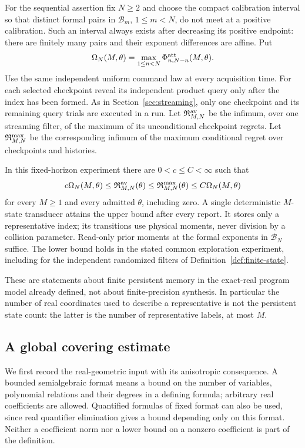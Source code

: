 For the sequential assertion fix $N\ge2$ and choose the compact
calibration interval so that distinct formal pairs in
$\mathcal B_m$, $1\le m<N$, do not meet at a positive calibration.
Such an interval always exists after decreasing its positive endpoint:
there are finitely many pairs and their exponent differences are affine.
Put
\begin{equation}\label{eq:general-stream-profile}
 \Omega_N(M,\theta)
   =\max_{1\le n<N}\Phi^{\rm att}_{n,N-n}(M,\theta).
\end{equation}
Use the same independent uniform command law at every acquisition time.
For each selected checkpoint reveal its independent product query only
after the index has been formed. As in Section~\ref{sec:streaming}, only
one checkpoint and its remaining query trials are executed in a run.
Let $\mathfrak R^{\rm av}_{M,N}$ be the infimum, over one streaming
filter, of the maximum of its unconditional checkpoint regrets. Let
$\mathfrak R^{\rm max}_{M,N}$ be the corresponding infimum of the
maximum conditional regret over checkpoints and histories.

\begin{theorem}\label{thm:general-uniform-streaming}
In this fixed-horizon experiment there are $0<c\le C<\infty$ such that
\begin{equation}\label{eq:general-stream-law}
 c\Omega_N(M,\theta)\le\mathfrak R^{\rm av}_{M,N}(\theta)
 \le\mathfrak R^{\rm max}_{M,N}(\theta)
 \le C\Omega_N(M,\theta)
\end{equation}
for every $M\ge1$ and every admitted $\theta$, including zero. A
single deterministic $M$-state transducer attains the upper bound after
every report. It stores only a representative index; its transitions use
physical moments, never division by a collision parameter. Read-only
prior moments at the formal exponents in $\mathcal B_N$ suffice.
The lower bound holds in the stated common exploration experiment,
including for the independent randomized filters of
Definition~\ref{def:finite-state}.
\end{theorem}

These are statements about finite persistent memory in the exact-real
program model already defined, not about finite-precision synthesis.
In particular the number of real coordinates used to describe a
representative is not the persistent state count: the latter is the
number of representative labels, at most $M$.

\subsection{A global covering estimate}
We first record the real-geometric input with its anisotropic consequence.
A bounded semialgebraic format means a bound on the number of variables,
polynomial relations and their degrees in a defining formula; arbitrary
real coefficients are allowed. Quantified formulas of fixed format can
also be used, since real quantifier elimination gives a bound depending
only on this format. Neither a coefficient norm nor a lower bound on a
nonzero coefficient is part of the definition.

